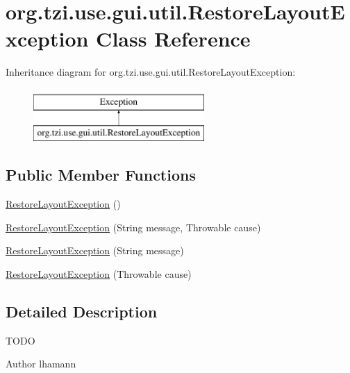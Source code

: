 \hypertarget{classorg_1_1tzi_1_1use_1_1gui_1_1util_1_1_restore_layout_exception}{\section{org.\-tzi.\-use.\-gui.\-util.\-Restore\-Layout\-Exception Class Reference}
\label{classorg_1_1tzi_1_1use_1_1gui_1_1util_1_1_restore_layout_exception}
}
Inheritance diagram for org.\-tzi.\-use.\-gui.\-util.\-Restore\-Layout\-Exception\-:\begin{figure}[H]
\begin{center}
\leavevmode
\includegraphics[height=2.000000cm]{classorg_1_1tzi_1_1use_1_1gui_1_1util_1_1_restore_layout_exception}
\end{center}
\end{figure}
\subsection*{Public Member Functions}
\begin{DoxyCompactItemize}
\item 
\hyperlink{classorg_1_1tzi_1_1use_1_1gui_1_1util_1_1_restore_layout_exception_ae73b754a432fb9629f823026c4edf665}{Restore\-Layout\-Exception} ()
\item 
\hyperlink{classorg_1_1tzi_1_1use_1_1gui_1_1util_1_1_restore_layout_exception_afff8d7553ea2f44e7eb791acf51c908f}{Restore\-Layout\-Exception} (String message, Throwable cause)
\item 
\hyperlink{classorg_1_1tzi_1_1use_1_1gui_1_1util_1_1_restore_layout_exception_a02a65badf2e946afcd62ed065565972b}{Restore\-Layout\-Exception} (String message)
\item 
\hyperlink{classorg_1_1tzi_1_1use_1_1gui_1_1util_1_1_restore_layout_exception_ae31a4a98e334b04b35ee5354bba7482f}{Restore\-Layout\-Exception} (Throwable cause)
\end{DoxyCompactItemize}


\subsection{Detailed Description}
T\-O\-D\-O \begin{DoxyAuthor}{Author}
lhamann 
\end{DoxyAuthor}


